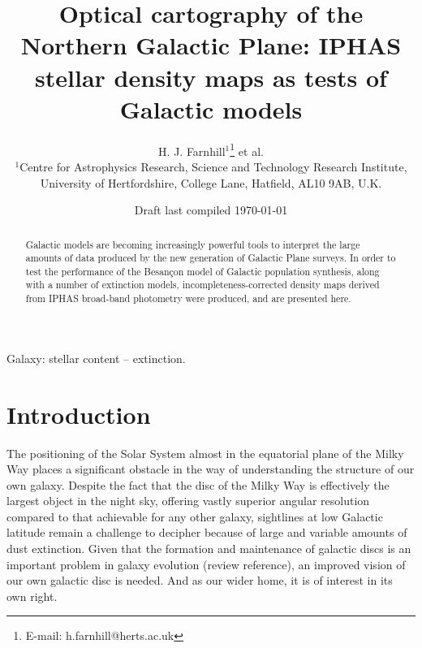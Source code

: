 \documentclass[a4paper,useAMS,usenatbib]{mn2e}
\title[Optical cartography of the Northern Galactic Plane]{Optical cartography 
of the Northern Galactic Plane: IPHAS stellar density maps as tests of Galactic models}
\author[H. J. Farnhill et al.]{H. J. Farnhill$^{1}$\thanks{E-mail:
h.farnhill@herts.ac.uk} et al.
\\
$^{1}$Centre for Astrophysics Research, Science and Technology Research Institute, University of Hertfordshire, College Lane, Hatfield, AL10 9AB, U.K.}
\begin{document}
\date{Draft last compiled \today}

\pagerange{\pageref{firstpage}--\pageref{lastpage}} 

\maketitle

\label{firstpage}

\begin{abstract}
Galactic models are becoming increasingly powerful tools to interpret the 
large amounts of data produced by the new generation of Galactic Plane 
surveys. In order to test the performance of the Besan\c{c}on model of 
Galactic population synthesis, along with a number of extinction models, 
incompleteness-corrected density maps derived from IPHAS broad-band photometry 
were produced, and are presented here.
\end{abstract}

\begin{keywords}
Galaxy: stellar content -- extinction.
\end{keywords}

\section{Introduction}

The positioning of the Solar System almost in the equatorial plane of the Milky
Way places a significant obstacle in the way of understanding the structure of our 
own galaxy.  Despite the fact that the disc of the Milky Way is effectively 
the largest object in the night sky, offering vastly superior angular resolution 
compared to that achievable for any other galaxy, sightlines at low Galactic latitude 
remain a challenge to decipher because of large and variable amounts of dust 
extinction.  Given that the formation and maintenance of galactic 
discs is an important problem in galaxy evolution (review reference), an improved 
vision of our own galactic disc is needed.  And as our wider home, it is of interest 
in its own right.
\end{document}
